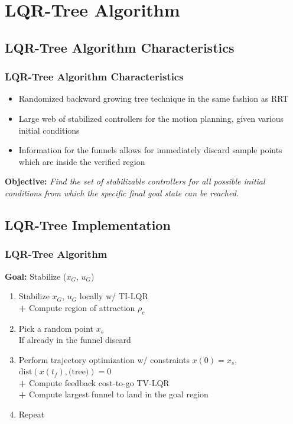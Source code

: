 \documentclass{beamer}
\begin{document}

\section{LQR-Tree Algorithm}
\subsection{LQR-Tree Algorithm Characteristics}
\begin{frame}
\frametitle{LQR-Tree Algorithm Characteristics}
\begin{itemize}
\item Randomized backward growing tree technique in the same fashion as RRT \vspace{.2cm} 
\item Large web of stabilized controllers for the motion planning, given various initial conditions \vspace{.2cm} 
\item Information for the funnels  allows for immediately discard sample points which are inside the verified region \vspace{.2cm}
\end{itemize}
\textbf{Objective:} \textit{Find the set of stabilizable controllers for all possible initial conditions from which the specific final goal state can be reached.}
\end{frame}


\begin{frame}
\subsection{LQR-Tree Implementation}
\frametitle{LQR-Tree Algorithm}
\textbf{Goal:} Stabilize ($x_G$, $u_G$)\vspace{.2cm}
\begin{enumerate}
\item Stabilize $x_G$, $u_G$ locally w/ TI-LQR\\
\textbf{+} Compute region of attraction $\rho_c$ \vspace{.2cm}
\item Pick a random point $x_s$\\
If already in the funnel discard\vspace{.2cm}
\item Perform trajectory optimization w/ constraints $x(0)=x_s$, $\text{dist}(x(t_f),\text{(tree)})=0$\\
\textbf{+} Compute feedback cost-to-go TV-LQR\\
\textbf{+} Compute largest funnel to land in the goal region\vspace{.2cm}
\item Repeat
\end{enumerate}
\end{frame}
\end{document}
